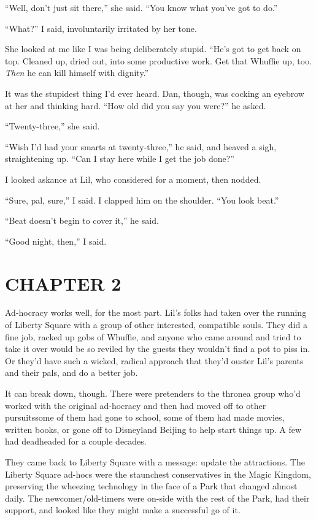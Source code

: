 “Well, don't just sit there,” she said. “You know what you've got
to do.”

“What?” I said, involuntarily irritated by her tone.

She looked at me like I was being deliberately stupid. “He's got to
get back on top. Cleaned up, dried out, into some productive work.
Get that Whuffie up, too. \emph{Then} he can kill himself with
dignity.”

It was the stupidest thing I'd ever heard. Dan, though, was cocking
an eyebrow at her and thinking hard. “How old did you say you
were?” he asked.

“Twenty-three,” she said.

“Wish I'd had your smarts at twenty-three,” he said, and heaved a
sigh, straightening up. “Can I stay here while I get the job
done?”

I looked askance at Lil, who considered for a moment, then nodded.

“Sure, pal, sure,” I said. I clapped him on the shoulder. “You look
beat.”

“Beat doesn't begin to cover it,” he said.

“Good night, then,” I said.

\section{CHAPTER 2}

Ad-hocracy works well, for the most part. Lil's folks had taken
over the running of Liberty Square with a group of other
interested, compatible souls. They did a fine job, racked up gobs
of Whuffie, and anyone who came around and tried to take it over
would be so reviled by the guests they wouldn't find a pot to piss
in. Or they'd have such a wicked, radical approach that they'd
ouster Lil's parents and their pals, and do a better job.

It can break down, though. There were pretenders to the throne{\dash}a
group who'd worked with the original ad-hocracy and then had moved
off to other pursuits{\dash}some of them had gone to school, some of them
had made movies, written books, or gone off to Disneyland Beijing
to help start things up. A few had deadheaded for a couple
decades.

They came back to Liberty Square with a message: update the
attractions. The Liberty Square ad-hocs were the staunchest
conservatives in the Magic Kingdom, preserving the wheezing
technology in the face of a Park that changed almost daily. The
newcomer/old-timers were on-side with the rest of the Park, had
their support, and looked like they might make a successful go of
it.

